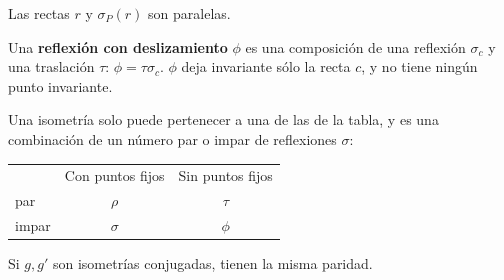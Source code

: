 Las rectas $r$ y $\sigma_P(r)$ son paralelas.

 Una \textbf{reflexión con deslizamiento} $\phi$ es una composición de una reflexión $\sigma_c$ y una traslación $\tau$: $\phi = \tau\sigma_c$. $\phi$ deja invariante sólo la recta $c$, y no tiene ningún punto invariante.

 Una isometría solo puede pertenecer a una de las de la tabla, y es una combinación de un número par o impar de reflexiones $\sigma$:

\begin{tabular}{l c c}
	& Con puntos fijos & Sin puntos fijos\\
	par & $\rho$ & $\tau$\\
	impar & $\sigma$ & $\phi$ \\
\end{tabular}


 Si $g, g'$ son isometrías conjugadas, tienen la misma paridad.






	 
	 